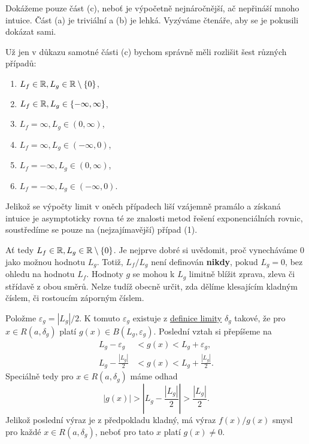 \begin{thmproof}
 Dokážeme pouze část (c), neboť je výpočetně nejnáročnější, ač nepřináší mnoho
 intuice. Část (a) je triviální a (b) je lehká. Vyzýváme čtenáře, aby se je
 pokusili dokázat sami.

 Už jen v důkazu samotné části (c) bychom správně měli rozlišit šest různých
 případů:
 \begin{enumerate}
  \item $L_f \in \mathbb{R}, L_g \in \mathbb{R} \setminus \{0\}$,
  \item $L_f \in \mathbb{R}, L_g \in \{-\infty,\infty\}$,
  \item $L_f = \infty, L_g \in (0,\infty)$,
  \item $L_f = \infty, L_g \in (-\infty,0)$,
  \item $L_f = -\infty, L_g \in (0,\infty)$,
  \item $L_f = -\infty, L_g \in (-\infty,0)$.
 \end{enumerate}
 Jelikož se výpočty limit v oněch případech liší vzájemně pramálo a získaná
 intuice je asymptoticky rovna té ze znalosti metod řešení exponenciálních
 rovnic, soustředíme se pouze na (nejzajímavější) případ (1).

 Ať tedy $L_f \in \mathbb{R}, L_g \in \mathbb{R} \setminus \{0\}$. Je nejprve dobré si uvědomit,
 proč vynecháváme $0$ jako možnou hodnotu $L_g$. Totiž, $L_f / L_g$ není
 definován \textbf{nikdy}, pokud $L_g = 0$, bez ohledu na hodnotu $L_f$. Hodnoty
 $g$ se mohou k $L_g$ limitně blížit zprava, zleva či střídavě z obou směrů.
 Nelze tudíž obecně určit, zda dělíme klesajícím kladným číslem, či rostoucím
 záporným číslem.

 Položme $\varepsilon_g = |L_g| / 2$. K tomuto $\varepsilon_g$ existuje z
 \hyperref[def:oboustranna-limita-funkce]{definice limity} $\delta_g$ takové, že
 pro $x \in R(a,\delta_g)$ platí $g(x) \in B(L_g,\varepsilon_g)$. Poslední vztah
 si přepíšeme na
 \begin{align*}
  L_g - \varepsilon_g & < g(x) < L_g + \varepsilon_g,\\
  L_g - \frac{|L_g|}{2} & < g(x) < L_g + \frac{|L_g|}{2}.
 \end{align*}
 Speciálně tedy pro $x \in R(a,\delta_g)$ máme odhad
 \[
  |g(x)| > \left| L_g - \frac{|L_g|}{2} \right| > \frac{|L_g|}{2}.
 \]
 Jelikož poslední výraz je z předpokladu kladný, má výraz $f(x) / g(x)$ smysl
 pro každé $x \in R(a,\delta_g)$, neboť pro tato $x$ platí $g(x) \neq 0$.


\end{thmproof}
